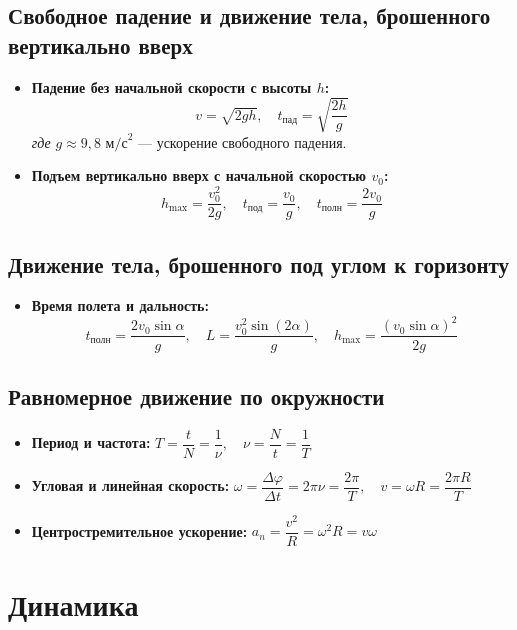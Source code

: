 \documentclass[11pt, a4paper]{article}
\begin{document}
\subsection{Свободное падение и движение тела, брошенного вертикально вверх}
\begin{itemize}
    \item \textbf{Падение без начальной скорости с высоты $h$:}
    \[ v = \sqrt{2gh}, \quad t_{\text{пад}} = \sqrt{\dfrac{2h}{g}} \]
    \textit{где} $g \approx 9,8 \text{ м/с}^2$ --- ускорение свободного падения.
    
    \item \textbf{Подъем вертикально вверх с начальной скоростью $v_0$:}
    \[ h_{\max} = \dfrac{v_0^2}{2g}, \quad t_{\text{под}} = \dfrac{v_0}{g}, \quad t_{\text{полн}} = \dfrac{2v_0}{g} \]
\end{itemize}

\subsection{Движение тела, брошенного под углом к горизонту}
\begin{itemize}
    \item \textbf{Время полета и дальность:}
    \[ t_{\text{полн}} = \dfrac{2v_0 \sin\alpha}{g}, \quad L = \dfrac{v_0^2 \sin(2\alpha)}{g}, \quad h_{\max} = \dfrac{(v_0 \sin\alpha)^2}{2g} \]
\end{itemize}

\subsection{Равномерное движение по окружности}
\begin{itemize}
    \item \textbf{Период и частота:} $T = \dfrac{t}{N} = \dfrac{1}{\nu}, \quad \nu = \dfrac{N}{t} = \dfrac{1}{T}$
    
    \item \textbf{Угловая и линейная скорость:} $\omega = \dfrac{\Delta\varphi}{\Delta t} = 2\pi\nu = \dfrac{2\pi}{T}, \quad v = \omega R = \dfrac{2\pi R}{T}$
    
    \item \textbf{Центростремительное ускорение:} $a_n = \dfrac{v^2}{R} = \omega^2 R = v\omega$
\end{itemize}

\section{Динамика}
\end{document}
